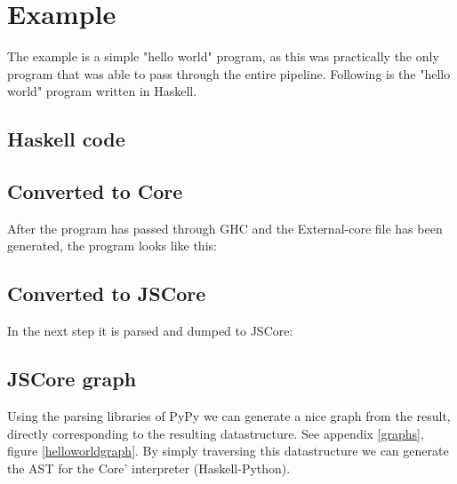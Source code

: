 
\section{Example}

The example is a simple "hello world" program, as this was practically
the only program that was able to pass through the entire pipeline. Following
is the "hello world" program written in Haskell.

\subsection{Haskell code}



\subsection{Converted to Core}

After the program has passed through GHC and the External-core file
has been generated, the program looks like this:



\subsection{Converted to JSCore}

In the next step it is parsed and dumped to JSCore:



\subsection{JSCore graph}

Using the parsing libraries of PyPy we can generate a nice graph from the result,
directly corresponding to the resulting datastructure. 
See appendix \ref{graphs}, figure \ref{helloworldgraph}.
By simply traversing this datastructure we can generate the AST for the Core' 
interpreter (Haskell-Python).

